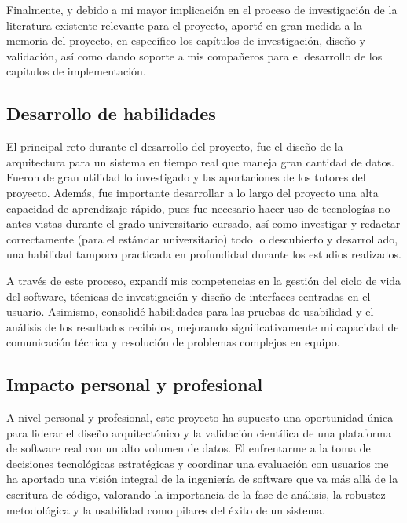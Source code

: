 Finalmente, y debido a mi mayor implicación en el proceso de investigación de la literatura existente relevante para el proyecto, aporté en gran medida a la memoria del proyecto, en específico los capítulos de investigación, diseño y validación, así como dando soporte a mis compañeros para el desarrollo de los capítulos de implementación.

\subsection*{Desarrollo de habilidades}
El principal reto durante el desarrollo del proyecto, fue el diseño de la arquitectura para un sistema en tiempo real que maneja gran cantidad de datos. Fueron de gran utilidad lo investigado y las aportaciones de los tutores del proyecto. Además, fue importante desarrollar a lo largo del proyecto una alta capacidad de aprendizaje rápido, pues fue necesario hacer uso de tecnologías no antes vistas durante el grado universitario cursado, así como investigar y redactar correctamente (para el estándar universitario) todo lo descubierto y desarrollado, una habilidad tampoco practicada en profundidad durante los estudios realizados.

A través de este proceso, expandí mis competencias en la gestión del ciclo de vida del software, técnicas de investigación y diseño de interfaces centradas en el usuario. Asimismo, consolidé habilidades para las pruebas de usabilidad y el análisis de los resultados recibidos, mejorando significativamente mi capacidad de comunicación técnica y resolución de problemas complejos en equipo.

\subsection*{Impacto personal y profesional}
A nivel personal y profesional, este proyecto ha supuesto una oportunidad única para liderar el diseño arquitectónico y la validación científica de una plataforma de software real con un alto volumen de datos. El enfrentarme a la toma de decisiones tecnológicas estratégicas y coordinar una evaluación con usuarios me ha aportado una visión integral de la ingeniería de software que va más allá de la escritura de código, valorando la importancia de la fase de análisis, la robustez metodológica y la usabilidad como pilares del éxito de un sistema.